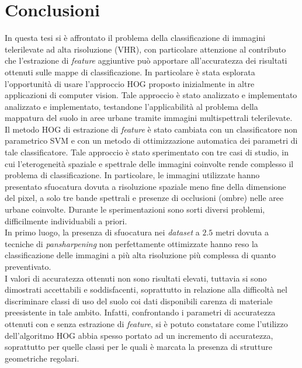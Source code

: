

\chapter{Conclusioni}
\label{cap:conclusioni}

In questa tesi si è affrontato il problema della classificazione di immagini telerilevate ad alta risoluzione (VHR), con particolare attenzione al contributo che l'estrazione di \emph{feature} aggiuntive può apportare all'accuratezza dei risultati ottenuti sulle mappe di classificazione.
In particolare è stata esplorata l'opportunità di usare l'approccio HOG proposto inizialmente in altre applicazioni di computer vision. Tale approccio è stato analizzato e implementato analizzato e implementato, testandone l'applicabilità al problema della mappatura del suolo in aree urbane tramite immagini multispettrali telerilevate.\\
Il metodo HOG di estrazione di \emph{feature} è stato cambiata con un classificatore non parametrico SVM e con un metodo di ottimizzazione automatica dei parametri di tale classificatore. Tale approccio è stato sperimentato con tre casi di studio, in cui l'eterogeneità spaziale e spettrale delle immagini coinvolte rende complesso il problema di classificazione. In particolare, le immagini utilizzate hanno presentato sfuocatura dovuta a risoluzione spaziale meno fine della dimensione del pixel, a solo tre bande spettrali e presenze di occlusioni (ombre) nelle aree urbane coinvolte.
Durante le sperimentazioni sono sorti diversi problemi, difficilmente individuabili a priori. \\
In primo luogo, la presenza di sfuocatura nei \emph{dataset} a $2.5$ metri dovuta a tecniche di \emph{pansharpening} non perfettamente ottimizzate hanno reso la classificazione delle immagini a più alta risoluzione più complessa di quanto preventivato.\\
I valori di accuratezza ottenuti non sono risultati elevati, tuttavia si sono dimostrati accettabili e soddisfacenti, soprattutto in relazione alla difficoltà nel discriminare classi di uso del suolo coi dati disponibili carenza di materiale preesistente in tale ambito. 
Infatti, confrontando i parametri di accuratezza ottenuti con e senza estrazione di \emph{feature}, si è potuto constatare come l'utilizzo dell'algoritmo HOG abbia spesso portato ad un incremento di accuratezza, soprattutto per quelle classi per le quali è marcata la presenza di strutture geometriche regolari. 
